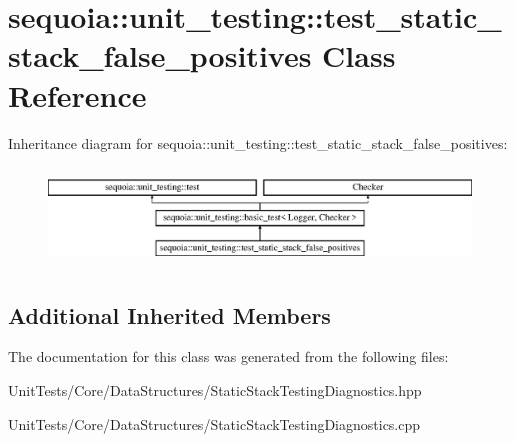 \hypertarget{classsequoia_1_1unit__testing_1_1test__static__stack__false__positives}{}\section{sequoia\+::unit\+\_\+testing\+::test\+\_\+static\+\_\+stack\+\_\+false\+\_\+positives Class Reference}
\label{classsequoia_1_1unit__testing_1_1test__static__stack__false__positives}
Inheritance diagram for sequoia\+::unit\+\_\+testing\+::test\+\_\+static\+\_\+stack\+\_\+false\+\_\+positives\+:\begin{figure}[H]
\begin{center}
\leavevmode
\includegraphics[height=2.633229cm]{classsequoia_1_1unit__testing_1_1test__static__stack__false__positives}
\end{center}
\end{figure}
\subsection*{Additional Inherited Members}


The documentation for this class was generated from the following files\+:\begin{DoxyCompactItemize}
\item 
Unit\+Tests/\+Core/\+Data\+Structures/Static\+Stack\+Testing\+Diagnostics.\+hpp\item 
Unit\+Tests/\+Core/\+Data\+Structures/Static\+Stack\+Testing\+Diagnostics.\+cpp\end{DoxyCompactItemize}
